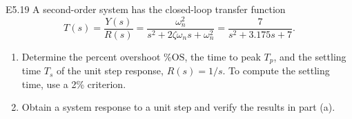 
\begin{problem}{E5.19}
  A second-order system has the closed-loop transfer function
  \begin{equation*}
    T(s) = \frac{Y(s)}{R(s)} = \frac{\omega_n^2}{s^2 + 2\zeta \omega_n s + \omega_n^2} = \frac{7}{s^2 + \num{3,175}s + 7}
  .\end{equation*}
  \begin{enumerate}[label=(\alph*)]
    \item Determine the percent overshoot $\% \mathrm{OS}$, the time to peak $T_p$, and the settling time $T_s$ of the unit step response, $R(s) = 1 / s$.
      To compute the settling time, use a 2\% criterion.
    \item Obtain a system response to a unit step and verify the results in part (a).
  \end{enumerate}
\end{problem}
